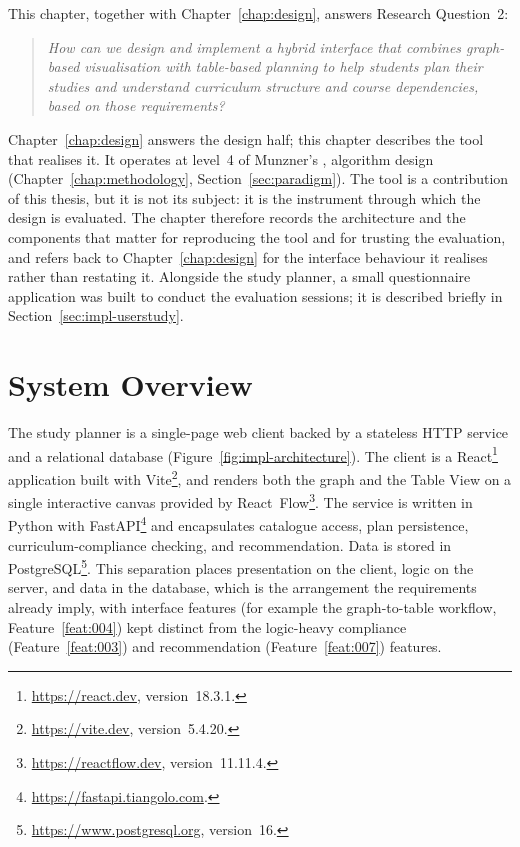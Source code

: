 \label{chap:implementation}
This chapter, together with Chapter~\ref{chap:design}, answers Research Question~2:

\begin{quote}
\textit{How can we design and implement a hybrid interface that combines graph-based visualisation with table-based planning to help students plan their studies and understand curriculum structure and course dependencies, based on those requirements?}
\end{quote}

Chapter~\ref{chap:design} answers the design half; this chapter describes the tool that realises it. It operates at level~4 of Munzner's , algorithm design (Chapter~\ref{chap:methodology}, Section~\ref{sec:paradigm}). The tool is a contribution of this thesis, but it is not its subject: it is the instrument through which the design is evaluated. The chapter therefore records the architecture and the components that matter for reproducing the tool and for trusting the evaluation, and refers back to Chapter~\ref{chap:design} for the interface behaviour it realises rather than restating it. Alongside the study planner, a small questionnaire application was built to conduct the evaluation sessions; it is described briefly in Section~\ref{sec:impl-userstudy}.

\section{System Overview}
\label{sec:impl-overview}

The study planner is a single-page web client backed by a stateless HTTP service and a relational database (Figure~\ref{fig:impl-architecture}). The client is a React\footnote{\url{https://react.dev}, version~18.3.1.} application built with Vite\footnote{\url{https://vite.dev}, version~5.4.20.}, and renders both the graph and the Table View on a single interactive canvas provided by React~Flow\footnote{\url{https://reactflow.dev}, version~11.11.4.}. The service is written in Python with FastAPI\footnote{\url{https://fastapi.tiangolo.com}.} and encapsulates catalogue access, plan persistence, curriculum-compliance checking, and recommendation. Data is stored in PostgreSQL\footnote{\url{https://www.postgresql.org}, version~16.}. This separation places presentation on the client, logic on the server, and data in the database, which is the arrangement the requirements already imply, with interface features (for example the graph-to-table workflow, Feature~\ref{feat:004}) kept distinct from the logic-heavy compliance (Feature~\ref{feat:003}) and recommendation (Feature~\ref{feat:007}) features.


